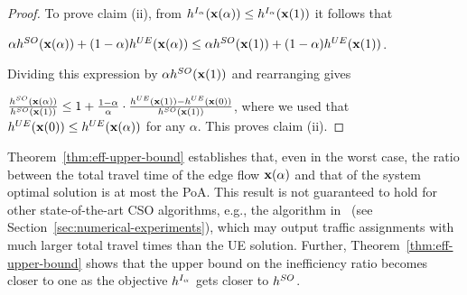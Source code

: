 \documentclass{article}
\newif\ifarxiv   %
\begin{document}
\begin{proof}
\ifarxiv
Now, to prove claim (ii), we note that $\objitap(\x(\alpha)) \leq \objitap(\x(1))$ since $\mathbf{x}(\alpha)$ is an optimal solution to I-TAP$_{\alpha}$. It thus follows that
\else
To prove claim (ii), from $\objitap(\x(\alpha)) \leq \objitap(\x(1))$ it follows that
\fi
\ifarxiv
\begin{align*}
    &\alpha \objso(\x(\alpha)) + (1-\alpha) \objue(\x(\alpha)) \leq \alpha \objso(\x(1)) + (1-\alpha) \objue(\x(1)).
\end{align*}
\else
$\alpha h^{SO}(\mathbf{x}(\alpha)) + (1-\alpha) h^{UE}(\mathbf{x}(\alpha)) \leq \alpha h^{SO}(\mathbf{x}(1)) + (1-\alpha) h^{UE}(\mathbf{x}(1))$.
\fi
Dividing this expression by $\alpha h^{SO}(\mathbf{x}(1))$ and rearranging gives \ifarxiv us that \fi
\ifarxiv
\begin{align*}
    \frac{\objso(\x(\alpha))}{\objso(\x(1))} &\leq 1+ \frac{1-\alpha}{\alpha}\cdot \frac{\objue(\x(1)) - \objue(\x(\alpha))}{\objso(\x(1))} \\
    &\leq 1+ \frac{1-\alpha}{\alpha}\cdot \frac{\objue(\x(1)) - \objue(\x(0))}{\objso(\x(1))},
\end{align*}
where the second inequality follows from the fact that $\objue(\x(0)) \leq \objue(\x(\alpha))$ for any $\alpha \in [0, 1]$. This proves claim (ii).
\else
$\frac{h^{SO}(\mathbf{x}(\alpha))}{h^{SO}(\mathbf{x}(1))} \leq 1+ \frac{1-\alpha}{\alpha}\cdot \frac{h^{UE}(\mathbf{x}(1)) - h^{UE}(\mathbf{x}(0))}{h^{SO}(\mathbf{x}(1))}$,
where we used that $\objue(\x(0)) \leq \objue(\x(\alpha))$ for any $\alpha$. This proves claim (ii).
\fi
\end{proof}
Theorem~\ref{thm:eff-upper-bound} establishes that, even in the worst case, the ratio between the total travel time of the edge flow $\mathbf{x}(\alpha)$ \ifarxiv of I-TAP$_{\alpha}$ \fi and that of the system optimal solution is at most the PoA. This result is not guaranteed to hold for other state-of-the-art CSO algorithms, \ifarxiv \else e.g., the algorithm in~\cite{so-routing-seminal} (see Section~\ref{sec:numerical-experiments}), \fi which may output traffic assignments with much larger total travel times than the UE solution. \ifarxiv For instance, in Section~\ref{sec:numerical-experiments} we show through numerical experiments that the algorithm proposed by Jahn et al. \cite{so-routing-seminal} achieves total travel times much higher than that of the user equilibrium solution for certain ranges of unfairness. \fi Further, Theorem~\ref{thm:eff-upper-bound} shows that the upper bound on the inefficiency ratio becomes closer to one as the objective $h^{I_{\alpha}}$ gets closer to $h^{SO}$.
\end{document}
